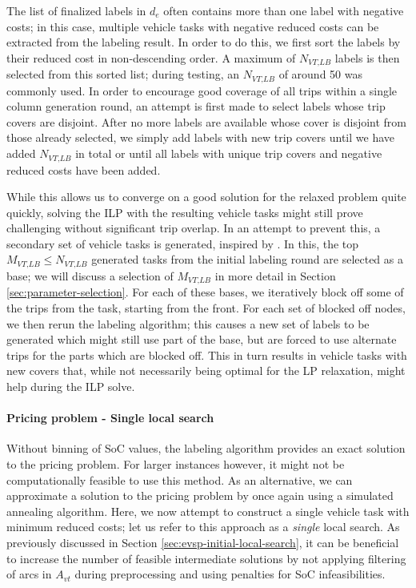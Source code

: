 \documentclass[]{article}
\begin{document}
The list of finalized labels in $d_e$ often contains more than one label with negative costs; in this case, multiple vehicle tasks with negative reduced costs can be extracted from the labeling result. In order to do this, we first sort the labels by their reduced cost in non-descending order. A maximum of $N_{\textit{VT,LB}}$ labels is then selected from this sorted list; during testing, an $N_{\textit{VT,LB}}$ of around 50 was commonly used. In order to encourage good coverage of all trips within a single column generation round, an attempt is first made to select labels whose trip covers are disjoint. After no more labels are available whose cover is disjoint from those already selected, we simply add labels with new trip covers until we have added $N_{\textit{VT,LB}}$ in total or until all labels with unique trip covers and negative reduced costs have been added. 

While this allows us to converge on a good solution for the relaxed problem quite quickly, solving the ILP with the resulting vehicle tasks might still prove challenging without significant trip overlap. In an attempt to prevent this, a secondary set of vehicle tasks is generated, inspired by \citet{Guido2009}. In this, the top $M_{\textit{VT,LB}} \leq N_{\textit{VT,LB}}$ generated tasks from the initial labeling round are selected as a base; we will discuss a selection of $M_{\textit{VT,LB}}$ in more detail in Section \ref{sec:parameter-selection}. For each of these bases, we iteratively block off some of the trips from the task, starting from the front. For each set of blocked off nodes, we then rerun the labeling algorithm; this causes a new set of labels to be generated which might still use part of the base, but are forced to use alternate trips for the parts which are blocked off. This in turn results in vehicle tasks with new covers that, while not necessarily being optimal for the LP relaxation, might help during the ILP solve.

\paragraph{Pricing problem - Single local search} \label{sec:evsp-pricing-local-search}
Without binning of SoC values, the labeling algorithm provides an exact solution to the pricing problem. For larger instances however, it might not be computationally feasible to use this method. As an alternative, we can approximate a solution to the pricing problem by once again using a simulated annealing algorithm. Here, we now attempt to construct a single vehicle task with minimum reduced costs; let us refer to this approach as a \emph{single} local search. As previously discussed in Section \ref{sec:evsp-initial-local-search}, it can be beneficial to increase the number of feasible intermediate solutions by not applying filtering of arcs in $A_{vt}$ during preprocessing and using penalties for SoC infeasibilities.
\end{document}
